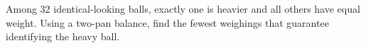 Among 32 identical-looking balls, exactly one is heavier and all others have equal weight. Using a two-pan balance, find the fewest weighings that guarantee identifying the heavy ball.
